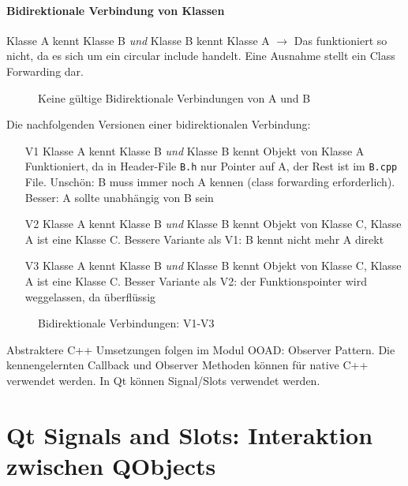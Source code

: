 \paragraph{Bidirektionale Verbindung von Klassen} 
Klasse A kennt Klasse B \emph{und} Klasse B kennt Klasse A \(\rightarrow\) Das funktioniert so nicht, da es sich um ein circular include handelt. Eine Ausnahme stellt ein Class Forwarding dar.
\begin{figure}[ht]
    \caption{Keine gültige Bidirektionale Verbindungen von A und B}
\end{figure}

Die nachfolgenden Versionen einer bidirektionalen Verbindung:
\begin{itemize}
    \item[V1] Klasse A kennt Klasse B \emph{und} Klasse B kennt Objekt von Klasse A
        Funktioniert, da in Header-File \texttt{B.h} nur Pointer auf A, der Rest ist im \texttt{B.cpp} File. Unschön: B muss immer noch A kennen (class forwarding erforderlich). Besser: A sollte unabhängig von B sein

    \item[V2] Klasse A kennt Klasse B \emph{und} Klasse B kennt Objekt von Klasse C, Klasse A ist eine Klasse C. Bessere Variante als V1: B kennt nicht mehr A direkt

    \item[V3] Klasse A kennt Klasse B \emph{und} Klasse B kennt Objekt von Klasse C, Klasse A ist eine Klasse C. Besser Variante als V2: der Funktionspointer wird weggelassen, da überflüssig
\end{itemize}

\begin{figure}[ht]
\caption[]{Bidirektionale Verbindungen: V1-V3}
\end{figure}

Abstraktere C++ Umsetzungen folgen im Modul OOAD: Observer Pattern.
Die kennengelernten Callback und Observer Methoden können für native C++ verwendet werden. In Qt können Signal/Slots verwendet werden.

\section[Qt signals and slots]{Qt Signals and Slots: Interaktion zwischen QObjects}

